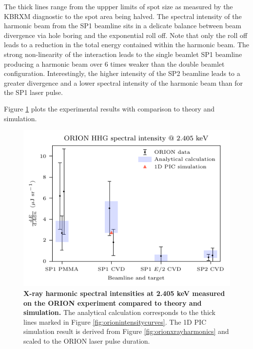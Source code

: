 The thick lines range from the uppper limits of spot size as measured by the KBRXM diagnostic to the spot area being halved. The spectral intensity of the harmonic beam from the SP1 beamline sits in a delicate balance between beam divergence via hole boring and the exponential roll off. Note that only the roll off leads to a reduction in the total energy contained within the harmonic beam. The strong non-linearity of the interaction leads to the single beamlet SP1 beamline producing a harmonic beam over 6 times weaker than the double beamlet configuration. Interestingly, the higher intensity of the SP2 beamline leads to a greater divergence and a lower spectral intensity of the harmonic beam than for the SP1 laser pulse.

Figure \ref{fig:orionexperimentresults} plots the experimental results with comparison to theory and simulation. 
\begin{figure}
	\centering
	\includegraphics{figures/orion/orion_experiment_results}
	\caption[X-ray harmonic intensities measured on the ORION experiment compared to theory and simulation.]{\textbf{X-ray harmonic spectral intensities at 2.405 keV measured on the ORION experiment compared to theory and simulation.} The analytical calculation corresponds to the thick lines marked in Figure \ref{fig:orionintensitycurves}. The 1D PIC simulation result is derived from Figure \ref{fig:orionxrayharmonics} and scaled to the ORION laser pulse duration.}
	\label{fig:orionexperimentresults}
\end{figure}
